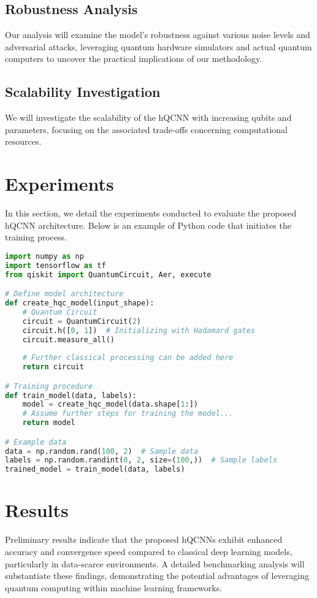 \documentclass{article}
\begin{document}
\subsection{Robustness Analysis}
Our analysis will examine the model's robustness against various noise levels and adversarial attacks, leveraging quantum hardware simulators and actual quantum computers to uncover the practical implications of our methodology.

\subsection{Scalability Investigation}
We will investigate the scalability of the hQCNN with increasing qubits and parameters, focusing on the associated trade-offs concerning computational resources.

\section{Experiments}
In this section, we detail the experiments conducted to evaluate the proposed hQCNN architecture. Below is an example of Python code that initiates the training process.

\begin{lstlisting}[language=Python]
import numpy as np
import tensorflow as tf
from qiskit import QuantumCircuit, Aer, execute

# Define model architecture
def create_hqc_model(input_shape):
    # Quantum Circuit
    circuit = QuantumCircuit(2)
    circuit.h([0, 1])  # Initializing with Hadamard gates
    circuit.measure_all()
    
    # Further classical processing can be added here
    return circuit

# Training procedure
def train_model(data, labels):
    model = create_hqc_model(data.shape[1:])
    # Assume further steps for training the model...
    return model

# Example data
data = np.random.rand(100, 2)  # Sample data
labels = np.random.randint(0, 2, size=(100,))  # Sample labels
trained_model = train_model(data, labels)
\end{lstlisting}

\section{Results}
Preliminary results indicate that the proposed hQCNNs exhibit enhanced accuracy and convergence speed compared to classical deep learning models, particularly in data-scarce environments. A detailed benchmarking analysis will substantiate these findings, demonstrating the potential advantages of leveraging quantum computing within machine learning frameworks.
\end{document}
